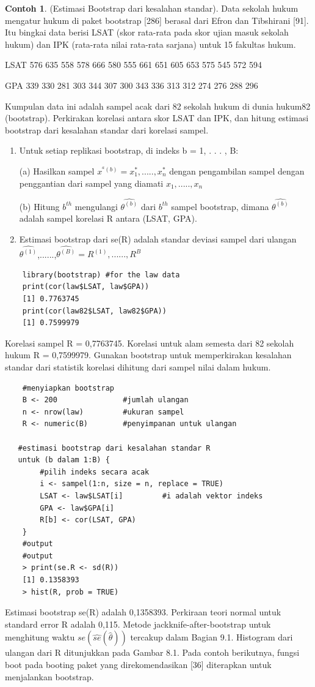 \documentclass[a4paper,12pt]{article}
\theoremstyle{definition}
\newtheorem{example}{Contoh}[section]
\begin{document}
\begin{example}
    (Estimasi Bootstrap dari kesalahan standar). Data sekolah hukum
mengatur hukum di paket bootstrap [286] berasal dari Efron dan Tibshirani [91]. Itu
bingkai data berisi LSAT (skor rata-rata pada skor ujian masuk sekolah hukum)
dan IPK (rata-rata nilai rata-rata sarjana) untuk 15 fakultas hukum.

    LSAT 576 635 558 578 666 580 555 661 651 605 653 575 545 572 594
    
    GPA  339 330 281 303 344 307 300 343 336 313 312 274 276 288 296

    Kumpulan data ini adalah sampel acak dari 82 sekolah hukum di dunia hukum82
(bootstrap). Perkirakan korelasi antara skor LSAT dan IPK, dan
hitung estimasi bootstrap dari kesalahan standar dari korelasi sampel.
\begin{enumerate}
    \item Untuk setiap replikasi bootstrap, di indeks b = 1, . . . , B:
    
        (a) Hasilkan sampel $x^{^{a}(b)}=x_{1}^{*},.....,x_{n}^{*}$ dengan  
        pengambilan sampel dengan penggantian dari sampel yang diamati $x_{1},.....,x_{n}$

        (b) Hitung $b^{th}$ mengulangi $\hat{\theta ^{(b)}}$ dari $b^{th}$ 
        sampel bootstrap, dimana $\hat{\theta ^{(b)}}$ adalah sampel korelasi R antara (LSAT, GPA).
    \item Estimasi bootstrap dari se(R) adalah standar deviasi sampel dari
       ulangan $\hat{\theta ^{(1)}}$,......,$\hat{\theta^{(B)}}=R^{(1)},......,R^{B}$
\end{enumerate}
   
\begin{lstlisting}
    library(bootstrap) #for the law data
    print(cor(law$LSAT, law$GPA))
    [1] 0.7763745
    print(cor(law82$LSAT, law82$GPA))
    [1] 0.7599979
\end{lstlisting}
    Korelasi sampel R = 0,7763745. Korelasi untuk alam semesta dari 82 sekolah hukum R = 0,7599979. Gunakan bootstrap untuk memperkirakan kesalahan standar dari statistik korelasi dihitung dari sampel nilai dalam hukum.
\begin{lstlisting}
    #menyiapkan bootstrap
    B <- 200               #jumlah ulangan
    n <- nrow(law)         #ukuran sampel
    R <- numeric(B)        #penyimpanan untuk ulangan

   #estimasi bootstrap dari kesalahan standar R
   untuk (b dalam 1:B) {
        #pilih indeks secara acak
        i <- sampel(1:n, size = n, replace = TRUE)
        LSAT <- law$LSAT[i]         #i adalah vektor indeks
        GPA <- law$GPA[i]
        R[b] <- cor(LSAT, GPA)
    }
    #output
    #output
    > print(se.R <- sd(R))
    [1] 0.1358393
    > hist(R, prob = TRUE)
\end{lstlisting}
Estimasi bootstrap se(R) adalah 0,1358393. Perkiraan teori normal untuk standard error R adalah 0,115. Metode jackknife-after-bootstrap untuk menghitung waktu $se(\widehat{se}(\widehat{\theta }))$ tercakup dalam Bagian 9.1. Histogram dari ulangan
dari R ditunjukkan pada Gambar 8.1.
Pada contoh berikutnya, fungsi boot pada booting paket yang direkomendasikan [36]
diterapkan untuk menjalankan bootstrap.
\end{example}
\end{document}
